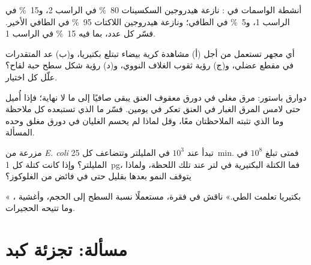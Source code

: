\begin{exercise}[$\star\star$]\label{exo:b1:cell-unit-of-life:8}
أنشطة الواسمات في : نازعة هيدروجين السكسينات \qty{80}{\%} في
الراسب 2، و\qty{15}{\%} في الراسب 1، و\qty{5}{\%} في الطافي؛ ونازعة
هيدروجين اللاكتات \qty{95}{\%} في الطافي الأخير. فسّر كل عدد، بما
فيه \qty{15}{\%} في الراسب 1.
\end{exercise}

\begin{exercise}[$\star\star$]\label{exo:b1:cell-unit-of-life:9}
أي مجهر تستعمل من أجل (أ) مشاهدة كرية بيضاء تبتلع بكتيريا، و(ب) عد
المتقدرات في مقطع عضلي، و(ج) رؤية ثقوب الغلاف النووي، و(د) رؤية شكل
سطح حبة لقاح؟ علّل كل اختيار.
\end{exercise}

\begin{exercise}[$\star\star\star$]\label{exo:b1:cell-unit-of-life:10}
دوارق باستور: مرق مغلي في دورق معقوف العنق يبقى صافيًا إلى ما لا
نهاية؛ فإذا أُميل حتى لامس المرق الغبار في العنق تعكر في يومين. فسّر
ما الذي تستبعده كل ملاحظة وما الذي تثبته الملاحظتان معًا، وقل لماذا
لم يحسم الغليان في دورق مغلق وحده المسألة.
\end{exercise}

\begin{exercise}[$\star\star\star$]\label{exo:b1:cell-unit-of-life:11}
مزرعة من \emph{E. coli} تبدأ عند $10^3$  في المليلتر وتتضاعف كل
\qty{25}{min}. فمتى تبلغ $10^8$ في المليلتر؟ وإذا كانت كتلة كل 
\qty{1}{pg}، فما الكتلة البكتيرية في لتر عند تلك اللحظة، ولماذا يتوقف
النمو بعدها بقليل حتى في فائض من الغلوكوز؟
\end{exercise}

\begin{exercise}[$\star\star\star$]\label{exo:b1:cell-unit-of-life:12}
« بكتيريا تعلمت الطي.» ناقش في فقرة، مستعملًا
نسبة السطح إلى الحجم، وأغشية ، وما تتيحه الحجيرات.
\end{exercise}

\section{مسألة: تجزئة كبد}

